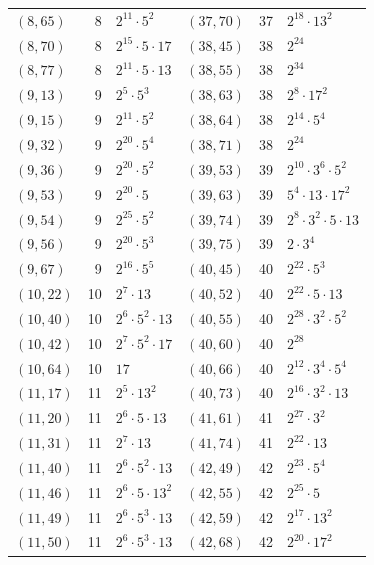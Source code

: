 \documentclass[11pt]{article}
\begin{document}
\begin{longtable}{@{}lrl@{\qquad}lrl@{}}
$(8,65)$ & 8 & $2^{11}\cdot 5^{2}$ & $(37,70)$ & 37 & $2^{18}\cdot 13^{2}$\\
$(8,70)$ & 8 & $2^{15}\cdot 5\cdot 17$ & $(38,45)$ & 38 & $2^{24}$\\
$(8,77)$ & 8 & $2^{11}\cdot 5\cdot 13$ & $(38,55)$ & 38 & $2^{34}$\\
$(9,13)$ & 9 & $2^{5}\cdot 5^{3}$ & $(38,63)$ & 38 & $2^{8}\cdot 17^{2}$\\
$(9,15)$ & 9 & $2^{11}\cdot 5^{2}$ & $(38,64)$ & 38 & $2^{14}\cdot 5^{4}$\\
$(9,32)$ & 9 & $2^{20}\cdot 5^{4}$ & $(38,71)$ & 38 & $2^{24}$\\
$(9,36)$ & 9 & $2^{20}\cdot 5^{2}$ & $(39,53)$ & 39 & $2^{10}\cdot 3^{6}\cdot 5^{2}$\\
$(9,53)$ & 9 & $2^{20}\cdot 5$ & $(39,63)$ & 39 & $5^{4}\cdot 13\cdot 17^{2}$\\
$(9,54)$ & 9 & $2^{25}\cdot 5^{2}$ & $(39,74)$ & 39 & $2^{8}\cdot 3^{2}\cdot 5\cdot 13$\\
$(9,56)$ & 9 & $2^{20}\cdot 5^{3}$ & $(39,75)$ & 39 & $2\cdot 3^{4}$\\
$(9,67)$ & 9 & $2^{16}\cdot 5^{5}$ & $(40,45)$ & 40 & $2^{22}\cdot 5^{3}$\\
$(10,22)$ & 10 & $2^{7}\cdot 13$ & $(40,52)$ & 40 & $2^{22}\cdot 5\cdot 13$\\
$(10,40)$ & 10 & $2^{6}\cdot 5^{2}\cdot 13$ & $(40,55)$ & 40 & $2^{28}\cdot 3^{2}\cdot 5^{2}$\\
$(10,42)$ & 10 & $2^{7}\cdot 5^{2}\cdot 17$ & $(40,60)$ & 40 & $2^{28}$\\
$(10,64)$ & 10 & $17$ & $(40,66)$ & 40 & $2^{12}\cdot 3^{4}\cdot 5^{4}$\\
$(11,17)$ & 11 & $2^{5}\cdot 13^{2}$ & $(40,73)$ & 40 & $2^{16}\cdot 3^{2}\cdot 13$\\
$(11,20)$ & 11 & $2^{6}\cdot 5\cdot 13$ & $(41,61)$ & 41 & $2^{27}\cdot 3^{2}$\\
$(11,31)$ & 11 & $2^{7}\cdot 13$ & $(41,74)$ & 41 & $2^{22}\cdot 13$\\
$(11,40)$ & 11 & $2^{6}\cdot 5^{2}\cdot 13$ & $(42,49)$ & 42 & $2^{23}\cdot 5^{4}$\\
$(11,46)$ & 11 & $2^{6}\cdot 5\cdot 13^{2}$ & $(42,55)$ & 42 & $2^{25}\cdot 5$\\
$(11,49)$ & 11 & $2^{6}\cdot 5^{3}\cdot 13$ & $(42,59)$ & 42 & $2^{17}\cdot 13^{2}$\\
$(11,50)$ & 11 & $2^{6}\cdot 5^{3}\cdot 13$ & $(42,68)$ & 42 & $2^{20}\cdot 17^{2}$\\

\end{longtable}
\end{document}
